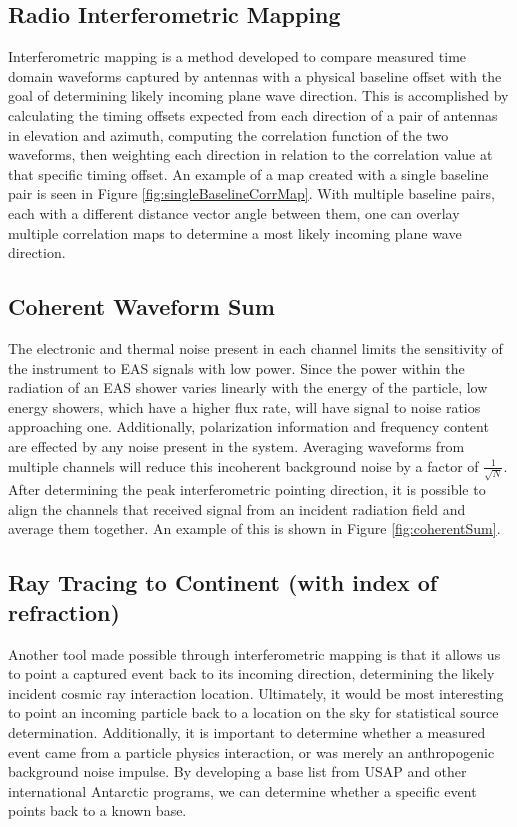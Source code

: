 	\subsection{Radio Interferometric Mapping}
		Interferometric mapping is a method developed to compare measured time domain waveforms captured by antennas with a physical baseline offset with the goal of determining likely incoming plane wave direction.  This is accomplished by calculating the timing offsets expected from each direction of a pair of antennas in elevation and azimuth, computing the correlation function of the two waveforms, then weighting each direction in relation to the correlation value at that specific timing offset.  An example of a map created with a single baseline pair is seen in Figure \ref{fig:singleBaselineCorrMap}.  With multiple baseline pairs, each with a different distance vector angle between them, one can overlay multiple correlation maps to determine a most likely incoming plane wave direction.
		
		
	\subsection{Coherent Waveform Sum}
		The electronic and thermal noise present in each channel limits the sensitivity of the instrument to EAS signals with low power.  Since the power within the radiation of an EAS shower varies linearly with the energy of the particle, low energy showers, which have a higher flux rate, will have signal to noise ratios approaching one.  Additionally, polarization information and frequency content are effected by any noise present in the system.  Averaging waveforms from multiple channels will reduce this incoherent background noise by a factor of $\frac{1}{\sqrt{N}}$.  After determining the peak interferometric pointing direction, it is possible to align the channels that received signal from an incident radiation field and average them together.  An example of this is shown in Figure \ref{fig:coherentSum}.
	
	
	\subsection{Ray Tracing to Continent (with index of refraction)}
		Another tool made possible through interferometric mapping is that it allows us to point a captured event back to its incoming direction, determining the likely incident cosmic ray interaction location.  Ultimately, it would be most interesting to point an incoming particle back to a location on the sky for statistical source determination.  Additionally, it is important to determine whether a measured event came from a particle physics interaction, or was merely an anthropogenic background noise impulse.  By developing a base list from USAP and other international Antarctic programs, we can determine whether a specific event points back to a known base.
		
